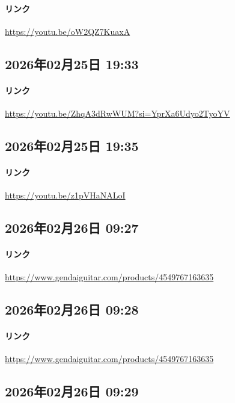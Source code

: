 \paragraph{リンク}
\url{https://youtu.be/oW2QZ7KuaxA}

\subsection*{2026年02月25日 19:33}

\paragraph{リンク}
\url{https://youtu.be/ZhqA3dRwWUM?si=YprXa6Udyo2TyoYV}

\subsection*{2026年02月25日 19:35}

\paragraph{リンク}
\url{https://youtu.be/z1pVHaNALoI}

\subsection*{2026年02月26日 09:27}

\paragraph{リンク}
\url{https://www.gendaiguitar.com/products/4549767163635}

\subsection*{2026年02月26日 09:28}

\paragraph{リンク}
\url{https://www.gendaiguitar.com/products/4549767163635}

\subsection*{2026年02月26日 09:29}

